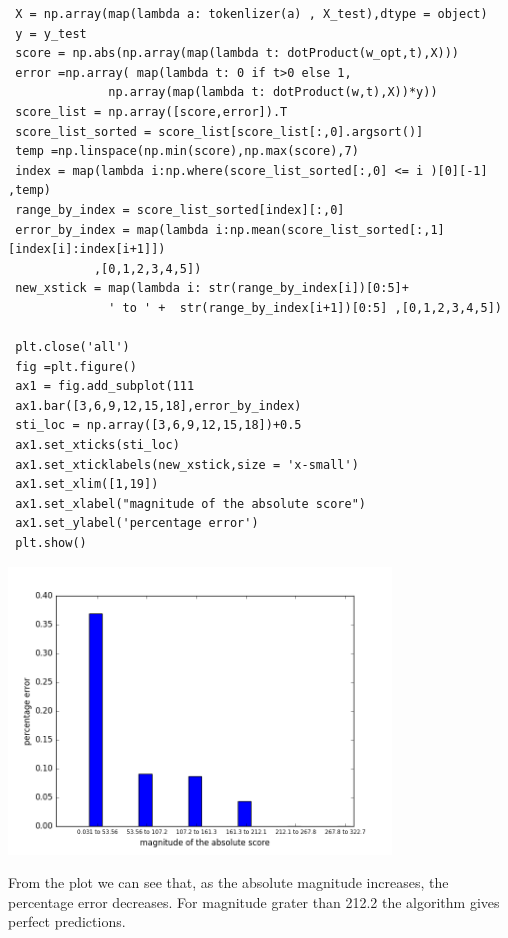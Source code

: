 \documentclass{article}
\newenvironment{problem}[2][$\bullet$]{\begin{trivlist}\large
		\item[\hskip \labelsep {\bfseries #1}\hskip \labelsep {\bfseries #2.}]}  {\end{trivlist}}
\begin{document}
\begin{problem}{6.7}
\end{problem}
\begin{verbatim}
 X = np.array(map(lambda a: tokenlizer(a) , X_test),dtype = object)
 y = y_test
 score = np.abs(np.array(map(lambda t: dotProduct(w_opt,t),X)))
 error =np.array( map(lambda t: 0 if t>0 else 1,
			  np.array(map(lambda t: dotProduct(w,t),X))*y))
 score_list = np.array([score,error]).T
 score_list_sorted = score_list[score_list[:,0].argsort()]
 temp =np.linspace(np.min(score),np.max(score),7)
 index = map(lambda i:np.where(score_list_sorted[:,0] <= i )[0][-1] ,temp)
 range_by_index = score_list_sorted[index][:,0]
 error_by_index = map(lambda i:np.mean(score_list_sorted[:,1][index[i]:index[i+1]])
			,[0,1,2,3,4,5])
 new_xstick = map(lambda i: str(range_by_index[i])[0:5]+
			  ' to ' +  str(range_by_index[i+1])[0:5] ,[0,1,2,3,4,5])
 
 plt.close('all')
 fig =plt.figure()
 ax1 = fig.add_subplot(111
 ax1.bar([3,6,9,12,15,18],error_by_index)
 sti_loc = np.array([3,6,9,12,15,18])+0.5
 ax1.set_xticks(sti_loc)
 ax1.set_xticklabels(new_xstick,size = 'x-small')
 ax1.set_xlim([1,19])
 ax1.set_xlabel("magnitude of the absolute score")
 ax1.set_ylabel('percentage error')
 plt.show()
 \end{verbatim}
\begin{center}
	\includegraphics[width = 4in]{6_7.png}
\end{center}

From the plot we can see that, as the absolute magnitude increases, the percentage error decreases. For magnitude grater than  212.2 the algorithm gives perfect predictions.

\pagebreak

\begin{problem}{6.8}
\end{problem}
\end{document}
